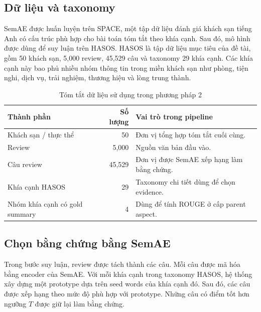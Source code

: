 \subsection{Dữ liệu và taxonomy}

SemAE được huấn luyện trên SPACE, một tập dữ liệu đánh giá khách sạn tiếng Anh có cấu trúc phù hợp cho bài toán tóm tắt theo khía cạnh. Sau đó, mô hình được dùng để suy luận trên HASOS. HASOS là tập dữ liệu mục tiêu của đề tài, gồm 50 khách sạn, 5,000 review, 45,529 câu và taxonomy 29 khía cạnh. Các khía cạnh này bao phủ nhiều nhóm thông tin trong miền khách sạn như phòng, tiện nghi, dịch vụ, trải nghiệm, thương hiệu và lòng trung thành.

\begin{table}[H]
\centering
\caption{Tóm tắt dữ liệu sử dụng trong phương pháp 2}
\label{tab:data-summary-method2}
\begin{tabularx}{0.92\textwidth}{l r X}
\toprule
\textbf{Thành phần} & \textbf{Số lượng} & \textbf{Vai trò trong pipeline} \\
\midrule
Khách sạn / thực thể & 50 & Đơn vị tổng hợp tóm tắt cuối cùng. \\
Review & 5,000 & Nguồn văn bản đầu vào. \\
Câu review & 45,529 & Đơn vị được SemAE xếp hạng làm bằng chứng. \\
Khía cạnh HASOS & 29 & Taxonomy chi tiết dùng để chọn evidence. \\
Nhóm khía cạnh có gold summary & 4 & Dùng để tính ROUGE ở cấp parent aspect. \\
\bottomrule
\end{tabularx}
\end{table}

\subsection{Chọn bằng chứng bằng SemAE}

Trong bước suy luận, review được tách thành các câu. Mỗi câu được mã hóa bằng encoder của SemAE. Với mỗi khía cạnh trong taxonomy HASOS, hệ thống xây dựng một prototype dựa trên seed words của khía cạnh đó. Sau đó, các câu được xếp hạng theo mức độ phù hợp với prototype. Những câu có điểm tốt hơn ngưỡng \(T\) được giữ lại làm bằng chứng.

